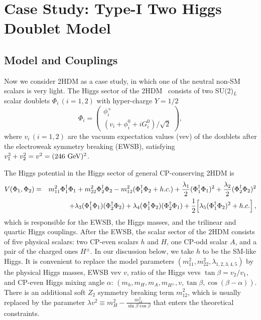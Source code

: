 \documentclass[letterpaper,11pt]{article}
\begin{document}
 \section{Case Study: Type-I Two Higgs Doublet Model}
 \label{sec:2HDM}

 
\subsection{Model and Couplings}

Now we consider 2HDM as a case study, in which one of the neutral  non-SM scalars is very light.   The Higgs sector of the 2HDM~\cite{Branco:2011iw} consists of two SU(2)$_L$ scalar doublets  $\Phi_i\,(i=1,2)$ with hyper-charge $Y=1/2$
\begin{equation}
        \Phi_i = \left(\begin{array}{c}
                \phi_i^+\\
                (v_i+\phi_i^0+iG_i^0)/\sqrt{2}
        \end{array}\right),
\end{equation}
where $v_i\,(i=1,2)$ are the vacuum expectation values (vev) of the doublets after the electroweak symmetry breaking (EWSB), satisfying $v_1^2+v_2^2=v^2=(246\ {\rm GeV})^2$.

The Higgs potential in the Higgs sector of general CP-conserving 2HDM is
\begin{eqnarray}
 V(\Phi_1, \Phi_2) &=& m_{11}^2\Phi_1^\dag \Phi_1 + m_{22}^2\Phi_2^\dag \Phi_2 -m_{12}^2(\Phi_1^\dag \Phi_2+ h.c.) + \frac{\lambda_1}{2}(\Phi_1^\dag \Phi_1)^2 + \frac{\lambda_2}{2}(\Phi_2^\dag \Phi_2)^2  \notag \\
 & &+ \lambda_3(\Phi_1^\dag \Phi_1)(\Phi_2^\dag \Phi_2)+\lambda_4(\Phi_1^\dag \Phi_2)(\Phi_2^\dag \Phi_1)+\frac{1}{2}   \Big[\lambda_5 (\Phi_1^\dag \Phi_2)^2 + h.c.\Big]\,,
 \label{eq:higgspotential}
\end{eqnarray}
which is responsible for the EWSB, the Higgs masses, and the trilinear and quartic Higgs couplings. 
After the EWSB, the scalar sector of the 2HDM consists of five physical scalars:  two CP-even scalars $h$ and $H$, one CP-odd scalar $A$, and a pair of the charged ones $H^\pm$. In our discussion below, we take $h$ to be the SM-like Higgs.   It is convenient to replace the model parameters $(m_{11}^2, m_{22}^2,  \lambda_{1,2,3,4,5})$ by the physical Higgs masses, EWSB vev $v$, ratio of the Higgs vevs $\tan\beta=v_2/v_1$, and CP-even Higgs mixing angle $\alpha$: $(m_h, m_H, m_A, m_{H^\pm}, v, \tan\beta, \cos(\beta-\alpha))$. There is an additional soft $Z_2$ symmetry breaking term $m_{12}^2$, which is usually replaced by the parameter $\lambda v^2\equiv m_H^2-\frac{m_{12}^2}{\sin\beta\cos\beta}$   that enters the theoretical constraints.   
\end{document}
